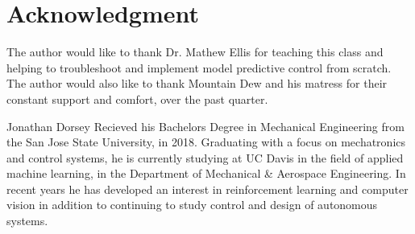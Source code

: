 \documentclass[journal]{IEEEtran}
\begin{document}
\section*{Acknowledgment}


The author would like to thank Dr. Mathew Ellis for teaching this class and helping to troubleshoot and implement model predictive control from scratch. \\


 The author would also like to thank Mountain Dew and his matress for their constant support and comfort, over the past quarter.


\ifCLASSOPTIONcaptionsoff
  \newpage
\fi

\printbibliography

\begin{IEEEbiography}{Jonathan Dorsey}
  Recieved his Bachelors Degree in Mechanical Engineering from the San Jose State University, in 2018. Graduating with a focus on mechatronics and control systems, he is currently studying at UC Davis in the field of applied machine learning, in the Department of Mechanical \& Aerospace Engineering. In recent years he has developed an interest in reinforcement learning and computer vision in addition to continuing to study control and design of autonomous systems.
\end{IEEEbiography}
\end{document}
